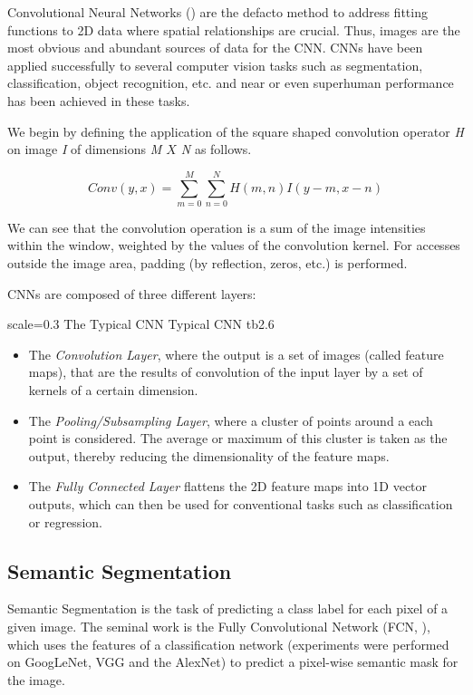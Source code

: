 Convolutional Neural Networks (\cite{LeCun1999}) are the defacto method to address fitting functions to 2D data where spatial relationships are crucial. Thus, images are the most obvious and abundant sources of data for the CNN. CNNs have been applied successfully to several computer vision tasks such as segmentation, classification, object recognition, etc. and near or even superhuman performance has been achieved in these tasks.

We begin by defining the application of the square shaped convolution operator \emph{H} on image \emph{I} of dimensions \emph{M $X$ N} as follows.

\[Conv(y, x) = \sum_{m=0}^{M}\sum_{n=0}^{N}H(m, n)I(y-m, x-n)\]

We can see that the convolution operation is a sum of the image intensities within the window, weighted by the values of the convolution kernel. For accesses outside the image area, padding (by reflection, zeros, etc.) is performed.

CNNs are composed of three different layers:
 
{scale=0.3}%
{The Typical CNN}%
{Typical CNN}%
{tb2.6} %
\begin{itemize}
	\item The \textit{Convolution Layer}, where the output is a set of images (called feature maps), that are the results of convolution of the input layer by a set of kernels of a certain dimension. \\
	\item The \textit{Pooling/Subsampling Layer}, where a cluster of points around a each point is considered. The average or maximum of this cluster is taken as the output, thereby reducing the dimensionality of the feature maps. \\ 
	\item The \textit{Fully Connected Layer} flattens the 2D feature maps into 1D vector outputs, which can then be used for conventional tasks such as classification or regression. 
\end{itemize}

\subsection{Semantic Segmentation}
Semantic Segmentation is the task of predicting a class label for each pixel of a given image. 
The seminal work is the Fully Convolutional Network (FCN, \cite{Long2014}), which uses the features of a classification network (experiments were performed on GoogLeNet, VGG and the AlexNet) to predict a pixel-wise semantic mask for the image. 

